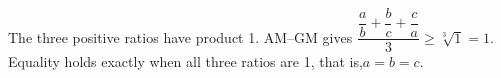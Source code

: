 The three positive ratios have product 1. AM--GM gives $\dfrac{\dfrac{a}{b}+\dfrac{b}{c}+\dfrac{c}{a}}{3}\ge\sqrt[3]{1}=1$. Equality holds exactly when all three ratios are 1, that is,$a=b=c$.
